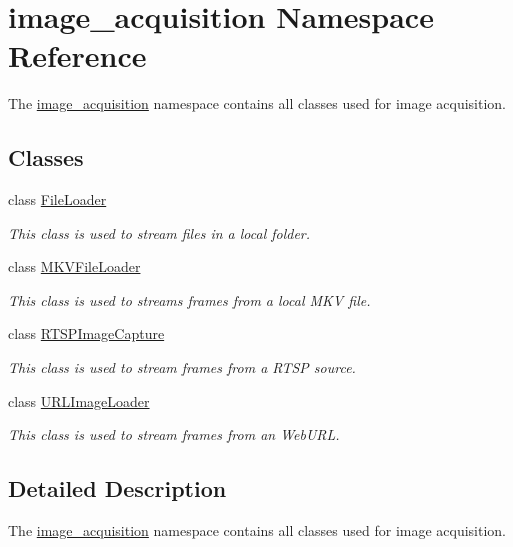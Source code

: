 \hypertarget{namespaceimage__acquisition}{}\section{image\+\_\+acquisition Namespace Reference}
\label{namespaceimage__acquisition}


The \mbox{\hyperlink{namespaceimage__acquisition}{image\+\_\+acquisition}} namespace contains all classes used for image acquisition.  


\subsection*{Classes}
\begin{DoxyCompactItemize}
\item 
class \mbox{\hyperlink{classimage__acquisition_1_1_file_loader}{File\+Loader}}
\begin{DoxyCompactList}\small\item\em This class is used to stream files in a local folder. \end{DoxyCompactList}\item 
class \mbox{\hyperlink{classimage__acquisition_1_1_m_k_v_file_loader}{M\+K\+V\+File\+Loader}}
\begin{DoxyCompactList}\small\item\em This class is used to streams frames from a local M\+KV file. \end{DoxyCompactList}\item 
class \mbox{\hyperlink{classimage__acquisition_1_1_r_t_s_p_image_capture}{R\+T\+S\+P\+Image\+Capture}}
\begin{DoxyCompactList}\small\item\em This class is used to stream frames from a R\+T\+SP source. \end{DoxyCompactList}\item 
class \mbox{\hyperlink{classimage__acquisition_1_1_u_r_l_image_loader}{U\+R\+L\+Image\+Loader}}
\begin{DoxyCompactList}\small\item\em This class is used to stream frames from an Web\+U\+RL. \end{DoxyCompactList}\end{DoxyCompactItemize}


\subsection{Detailed Description}
The \mbox{\hyperlink{namespaceimage__acquisition}{image\+\_\+acquisition}} namespace contains all classes used for image acquisition. 